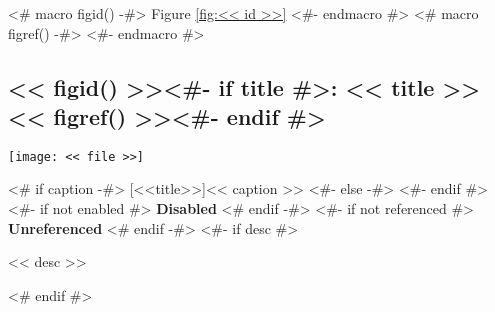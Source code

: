 <# macro figid() -#>
Figure \ref{fig:<< id >>}
<#- endmacro #>
<# macro figref() -#>
\color{light-gray}
<#- endmacro #>

\begin{samepage}
  \subsection[<< figid() >><#- if title #>: \textit{<< title >>}<#- endif #>~~\small{<< figref() >>}]%
  {<< figid() >><#- if title #>: \GothamLight\small{<< title >>} \hfill << figref() >><#- endif #>}
\nopagebreak
\noindent\centerline{\texttt{[image: << file >>]}}
<# if caption -#>
\nopagebreak
{}[<<title>>]{<< caption >>}
<#- else -#>
<#- endif #>\label{fig:<< id >>}
<#- if not enabled #>
{\color{red}\textbf{Disabled}}
<# endif -#>
<#- if not referenced #>
{\color{red}\textbf{Unreferenced}}
<# endif -#>
<#- if desc #>
\nopagebreak
\begin{figinfo}<< desc >>\end{figinfo}
<# endif #>
\end{samepage}
\pagebreak
